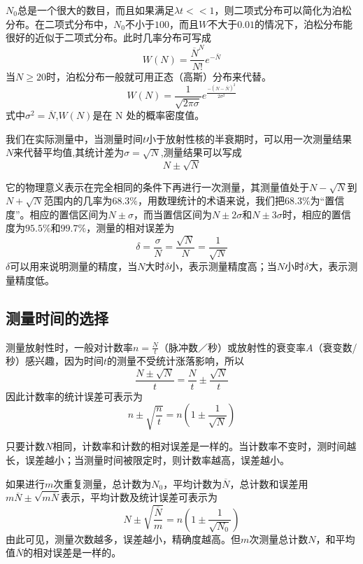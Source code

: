 \documentclass[hyperref]{ctexart}
\begin{document}
\begin{multicols}{2}
$N_0$总是一个很大的数目，而且如果满足$\lambda t<<1$，则二项式分布可以简化为泊松分布。在二项式分布中，$N_0$不小于$100$，而且$W$不大于$0.01$的情况下，泊松分布能很好的近似于二项式分布。此时几率分布可写成\begin{equation}W(N)=\frac{\overline{N}^N}{N!}e^{-\overline{N}} \label{bs}\end{equation}
当$N\geq 20$时，泊松分布一般就可用正态（高斯）分布来代替。\begin{equation}W(N)=\frac{1}{\sqrt{2\pi \sigma}}e^{\frac{-(N-\overline{N})^2}{2 \sigma^2}}\end{equation}式中$\sigma^2=\overline{N}$,$W(N)$是在 N 处的概率密度值。

我们在实际测量中，当测量时间$t$小于放射性核的半衰期时，可以用一次测量结果$N$来代替平均值,其统计差为$\sigma=\sqrt{N}$,测量结果可以写成\begin{equation}N\pm\sqrt{N}\label{wucha}\end{equation}

它的物理意义表示在完全相同的条件下再进行一次测量，其测量值处于$N-\sqrt{N}$到$N+\sqrt{N}$范围内的几率为$68.3\%$，用数理统计的术语来说，我们把$68.3\%$为“置信度”。相应的置信区间为$N\pm\sigma$，而当置信区间为$N\pm 2\sigma$和$N\pm3\sigma$时，相应的置信度为$95.5\%$和$99.7\%$，测量的相对误差为\begin{equation}\delta=\frac{\sigma}{N}=\frac{\sqrt{N}}{N}=\frac{1}{\sqrt{N}}\label{delta}\end{equation}
$\delta$可以用来说明测量的精度，当$N$大时$\delta$小，表示测量精度高；当$N$小时$\delta$大，表示测量精度低。
\subsection{测量时间的选择}
测量放射性时，一般对计数率$n=\frac{N}{t}$（脉冲数／秒）或放射性的衰变率$A$（衰变数/秒）感兴趣，因为时间$t$的测量不受统计涨落影响，所以\begin{equation}\frac{N\pm\sqrt{N}}{t}=\frac{N}{t}\pm\frac{\sqrt{N}}{t}\end{equation}
因此计数率的统计误差可表示为\begin{equation}n\pm\sqrt{\frac{n}{t}}=n(1\pm\frac{1}{\sqrt{N}})\label{tjwc}\end{equation}

只要计数$N$相同，计数率和计数的相对误差是一样的。当计数率不变时，测时间越长，误差越小；当测量时间被限定时，则计数率越高，误差越小。

如果进行$m$次重复测量，总计数为$N_0$，平均计数为$\overline{N}$，总计数和误差用$m\overline{N}\pm\sqrt{m\overline{N}}$表示，平均计数及统计误差可表示为\begin{equation}N\pm\sqrt{\frac{\overline{N}}{m}}=n(1\pm\frac{1}{\sqrt{N_0}})\label{jswc}\end{equation}
由此可见，测量次数越多，误差越小，精确度越高。但$m$次测量总计数$N$，和平均值$\overline{N}$的相对误差是一样的。


\end{multicols}
\end{document}
